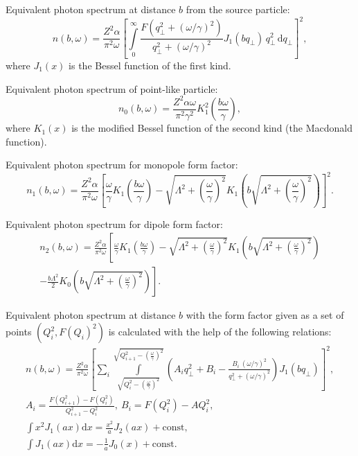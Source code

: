 \documentclass[a4paper,12pt]{article}
\begin{document}
Equivalent photon spectrum at distance $b$ from the source particle:
\begin{equation}
  n(b, \omega)
  = \frac{Z^2 \alpha}{\pi^2 \omega}
    \left[
      \int\limits_0^\infty
        \frac{F(q_\perp^2 + (\omega / \gamma)^2)}
             {q_\perp^2 + (\omega / \gamma)^2}
        J_1(b q_\perp)
        \, q_\perp^2
        \, \mathrm{d} q_\perp
    \right]^2,
\end{equation}
where $J_1(x)$ is the Bessel function of the first kind.

Equivalent photon spectrum of point-like particle:
\begin{equation}
  n_0(b, \omega)
  = \frac{Z^2 \alpha \omega}{\pi^2 \gamma^2}
    K_1^2 \left( \frac{b \omega}{\gamma} \right),
\end{equation}
where $K_1(x)$ is the modified Bessel function of the second kind (the Macdonald
function).

Equivalent photon spectrum for monopole form factor:
\begin{equation}
  n_1(b, \omega)
  = \frac{Z^2 \alpha}{\pi^2 \omega}
    \left[
        \frac{\omega}{\gamma} K_1 \left( \frac{b \omega}{\gamma} \right)
      - \sqrt{\Lambda^2 + \left( \frac{\omega}{\gamma} \right)^2}
        K_1 \left(
          b \sqrt{\Lambda^2 + \left( \frac{\omega}{\gamma} \right)^2}
        \right)
    \right]^2.
\end{equation}

Equivalent photon spectrum for dipole form factor:
\begin{multline}
  n_2(b, \omega)
  = \frac{Z^2 \alpha}{\pi^2 \omega}
    \left[
        \frac{\omega}{\gamma} K_1 \left( \frac{b \omega}{\gamma} \right)
      - \sqrt{\Lambda^2 + \left( \frac{\omega}{\gamma} \right)^2}
        K_1 \left(
          b \sqrt{\Lambda^2 + \left( \frac{\omega}{\gamma} \right)^2}
        \right)
  \right. \\ \left.
      - \frac{b \Lambda^2}{2}
        K_0 \left(
          b \sqrt{\Lambda^2 + \left( \frac{\omega}{\gamma} \right)^2}
        \right)
    \right].
\end{multline}

Equivalent photon spectrum at distance $b$ with the form factor given as a set
of points $(Q_i^2, F(Q_i)^2)$ is calculated with the help of the following
relations:
\begin{gather}
  n(b, \omega)
  = \frac{Z^2 \alpha}{\pi^2 \omega}
    \left[
      \sum\limits_i
        \int\limits_{\sqrt{Q_i^2 - \left( \frac{\omega}{\gamma} \right)^2}}
                   ^{\sqrt{Q_{i+1}^2 - \left( \frac{\omega}{\gamma} \right)^2}}
          \left(
              A_i q_\perp^2
            + B_i
            - \frac{B_i \ (\omega / \gamma)^2}{q_\perp^2 + (\omega / \gamma)^2}
          \right)
          J_1(b q_\perp)
    \right]^2,
  \\
  A_i = \frac{F(Q_{i+1}^2) - F(Q_i^2)}{Q_{i+1}^2 - Q_i^2},
  \ 
  B_i = F(Q_i^2) - A Q_i^2,
  \\
  \int x^2 J_1(a x) \mathrm{d} x = \frac{x^2}{a} J_2(a x) + \text{const}, \\
  \int J_1(a x) \mathrm{d} x = -\frac{1}{a} J_0(x) + \text{const}.
\end{gather}
\end{document}
